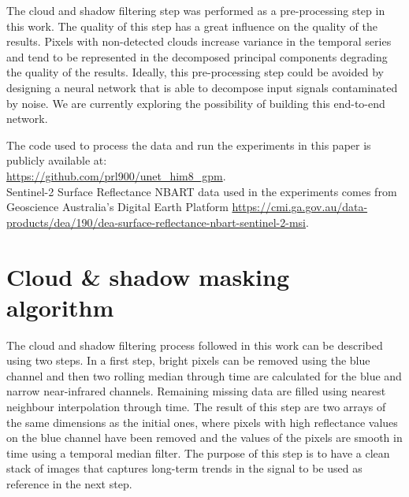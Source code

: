 \documentclass[essd, manuscript]{copernicus}
\begin{document}
The cloud and shadow filtering step was performed as a pre-processing step in this work. The quality of this step has a great influence on the quality of the results. Pixels with non-detected clouds increase variance in the temporal series and tend to be represented in the decomposed principal components degrading the quality of the results. Ideally, this pre-processing step could be avoided by designing a neural network that is able to decompose input signals contaminated by noise. We are currently exploring the possibility of building this end-to-end network.






\codedataavailability{} 
The code used to process the data and run the experiments in this paper is publicly available at: \\
\href{https://github.com/prl900/unet_him8_gpm}{https://github.com/prl900/unet\_him8\_gpm}. \\
Sentinel-2 Surface Reflectance NBART data used in the experiments comes from Geoscience Australia's Digital Earth Platform \href{https://cmi.ga.gov.au/data-products/dea/190/dea-surface-reflectance-nbart-sentinel-2-msi}{https://cmi.ga.gov.au/data-products/dea/190/dea-surface-reflectance-nbart-sentinel-2-msi}. 



\appendix
\section{Cloud \& shadow masking algorithm} %

The cloud and shadow filtering process followed in this work can be described using two steps. In a first step, bright pixels can be removed using the blue channel and then two rolling median through time are calculated for the blue and narrow near-infrared channels. Remaining missing data are filled using nearest neighbour interpolation through time. The result of this step are two arrays of the same dimensions as the initial ones, where pixels with high reflectance values on the blue channel have been removed and the values of the pixels are smooth in time using a temporal median filter. The purpose of this step is to have a clean stack of images that captures long-term trends in the signal to be used as reference in the next step.
\end{document}
